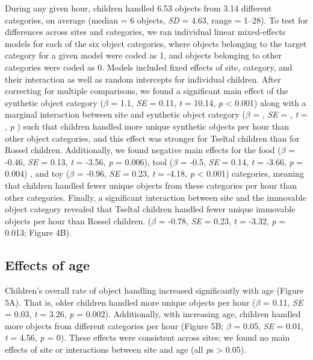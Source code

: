 \documentclass[10pt, letterpaper]{article}
\begin{document}
During any given hour, children handled 6.53 objects from 3.14 different
categories, on average (median = 6 objects, \emph{SD} = 4.63, range =
1--28). To test for differences across sites and categories, we ran
individual linear mixed-effects models for each of the six object
categories, where objects belonging to the target category for a given
model were coded as 1, and objects belonging to other categories were
coded as 0. Models included fixed effects of site, category, and their
interaction as well as random intercepts for individual children. After
correcting for multiple comparisons, we found a significant main effect
of the synthetic object category (\(\beta\) = 1.1, \emph{SE} = 0.11,
\emph{t} = 10.14, \emph{p} \textless{} 0.001) along with a marginal
interaction between site and synthetic object category (\(\beta\) = ,
\emph{SE} = , \emph{t} = , \emph{p} ) such that children handled more
unique synthetic objects per hour than other object categories, and this
effect was stronger for Tseltal children than for Rossel children.
Additionally, we found negative main effects for the food (\(\beta\) =
-0.46, \emph{SE} = 0.13, \emph{t} = -3.56, \emph{p} = 0.006), tool
(\(\beta\) = -0.5, \emph{SE} = 0.14, \emph{t} = -3.66, \emph{p} = 0.004)
, and toy (\(\beta\) = -0.96, \emph{SE} = 0.23, \emph{t} = -4.18,
\emph{p} \textless{} 0.001) categories, meaning that children handled
fewer unique objects from these categories per hour than other
categories. Finally, a significant interaction between site and the
immovable object category revealed that Tseltal children handled fewer
unique immovable objects per hour than Rossel children. (\(\beta\) =
-0.78, \emph{SE} = 0.23, \emph{t} = -3.32, \emph{p} = 0.013; Figure 4B).

\hypertarget{effects-of-age}{%
\subsection{Effects of age}\label{effects-of-age}}

Children's overall rate of object handling increased significantly with
age (Figure 5A). That is, older children handled more unique objects per
hour (\(\beta\) = 0.11, \emph{SE} = 0.03, \emph{t} = 3.26, \emph{p} =
0.002). Additionally, with increasing age, children handled more objects
from different categories per hour (Figure 5B; \(\beta\) = 0.05,
\emph{SE} = 0.01, \emph{t} = 4.56, \emph{p} = 0). These effects were
consistent across sites; we found no main effects of site or
interactions between site and age (all \emph{p}s \textgreater{} 0.05).
\end{document}
